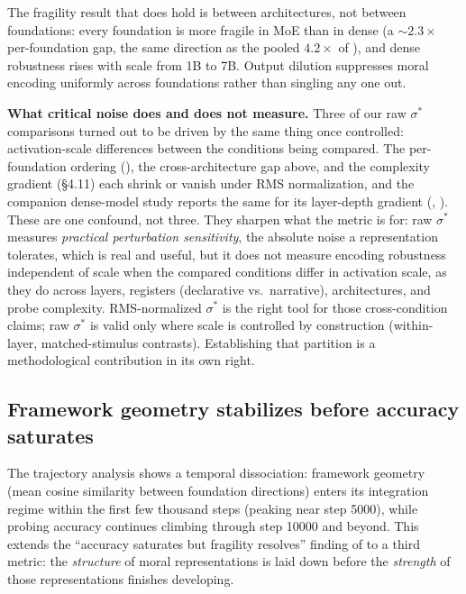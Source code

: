 The fragility result that does hold is between architectures, not
between foundations: every foundation is more fragile in MoE than in
dense (a \({\sim}2.3\times\) per-foundation gap, the same direction as the
pooled \(4.2\times\) of \citet{reblitzrichardson2026dilution}), and dense
robustness rises with scale from 1B to 7B. Output dilution suppresses
moral encoding uniformly across foundations rather than singling any
one out.

\textbf{What critical noise does and does not measure.} Three of our raw
\(\sigma^*\) comparisons turned out to be driven by the same thing once
controlled: activation-scale differences between the conditions being
compared. The per-foundation ordering (), the cross-architecture
gap above, and the complexity gradient (\S4.11) each shrink or vanish
under RMS normalization, and the companion dense-model study reports the
same for its layer-depth gradient
(\citealp{reblitzrichardson2026fragility}, ). These are one
confound, not three. They sharpen what the metric is for: raw \(\sigma^*\)
measures \emph{practical perturbation sensitivity}, the absolute noise a
representation tolerates, which is real and useful, but it does not
measure encoding robustness independent of scale when the compared
conditions differ in activation scale, as they do across layers,
registers (declarative vs.~narrative), architectures, and probe
complexity. RMS-normalized \(\sigma^*\) is the right tool for those
cross-condition claims; raw \(\sigma^*\) is valid only where scale is
controlled by construction (within-layer, matched-stimulus contrasts).
Establishing that partition is a methodological contribution in its own
right.

\subsection{Framework geometry stabilizes before accuracy saturates}\label{framework-geometry-stabilizes-before-accuracy-saturates}

The trajectory analysis shows a temporal dissociation: framework
geometry (mean cosine similarity between foundation directions)
enters its integration regime within the first few thousand steps
(peaking near step 5000), while probing accuracy continues climbing
through step 10000 and beyond. This extends the ``accuracy saturates
but fragility resolves'' finding of
\citet{reblitzrichardson2026fragility} to a third metric: the
\emph{structure} of moral representations is laid down before the
\emph{strength} of those representations finishes developing.

